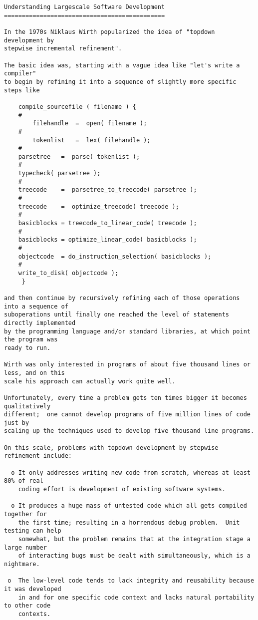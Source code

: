 \begin{verbatim}
Understanding Largescale Software Development
=============================================

In the 1970s Niklaus Wirth popularized the idea of "topdown development by
stepwise incremental refinement".

The basic idea was, starting with a vague idea like "let's write a compiler"
to begin by refining it into a sequence of slightly more specific steps like

    compile_sourcefile ( filename ) {
	#
        filehandle  =  open( filename );
	#
        tokenlist   =  lex( filehandle );
	#
	parsetree   =  parse( tokenlist );
	#
	typecheck( parsetree );
	#
	treecode    =  parsetree_to_treecode( parsetree );
	#
	treecode    =  optimize_treecode( treecode );
	#
	basicblocks = treecode_to_linear_code( treecode );
	#
	basicblocks = optimize_linear_code( basicblocks );
	#
	objectcode  = do_instruction_selection( basicblocks );
	#
	write_to_disk( objectcode );
     }

and then continue by recursively refining each of those operations into a sequence of
suboperations until finally one reached the level of statements directly implemented
by the programming language and/or standard libraries, at which point the program was
ready to run.

Wirth was only interested in programs of about five thousand lines or less, and on this
scale his approach can actually work quite well.

Unfortunately, every time a problem gets ten times bigger it becomes qualitatively
different;  one cannot develop programs of five million lines of code just by
scaling up the techniques used to develop five thousand line programs.

On this scale, problems with topdown development by stepwise refinement include:

  o It only addresses writing new code from scratch, whereas at least 80% of real
    coding effort is development of existing software systems.

  o It produces a huge mass of untested code which all gets compiled together for
    the first time; resulting in a horrendous debug problem.  Unit testing can help
    somewhat, but the problem remains that at the integration stage a large number
    of interacting bugs must be dealt with simultaneously, which is a nightmare.

 o  The low-level code tends to lack integrity and reusability because it was developed
    in and for one specific code context and lacks natural portability to other code
    contexts.



\end{verbatim}
